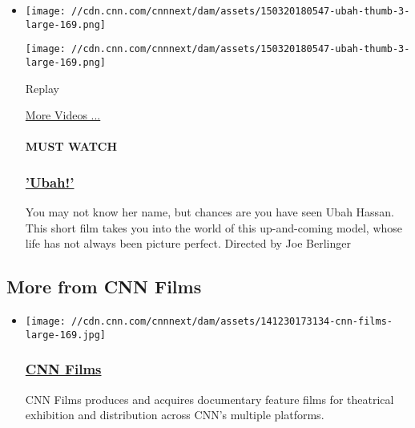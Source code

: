 \begin{itemize}
\item
  \texttt{[image: //cdn.cnn.com/cnnnext/dam/assets/150320180547-ubah-thumb-3-large-169.png]}

  \texttt{[image: //cdn.cnn.com/cnnnext/dam/assets/150320180547-ubah-thumb-3-large-169.png]}\href{javascript:void(0);}{}

  Replay

  \href{/videos}{More Videos ...}

  \hypertarget{must-watch-4}{%
  \paragraph{MUST WATCH}\label{must-watch-4}}

  \hypertarget{ubah}{%
  \subsubsection{\texorpdfstring{\href{/videos/us/2015/03/24/digital-shorts-ubah-fashion-model-orig.cnn}{'Ubah!'}}{'Ubah!'}}\label{ubah}}

  You may not know her name, but chances are you have seen Ubah Hassan.
  This short film takes you into the world of this up-and-coming model,
  whose life has not always been picture perfect. Directed by Joe
  Berlinger
\end{itemize}

\hypertarget{more-from-cnn-films-}{%
\subsection{More from CNN Films~}\label{more-from-cnn-films-}}

\begin{itemize}
\item
  \href{http://www.cnn.com/shows/cnn-films}{}

  \texttt{[image: //cdn.cnn.com/cnnnext/dam/assets/141230173134-cnn-films-large-169.jpg]}

  \hypertarget{cnn-films}{%
  \subsubsection{\texorpdfstring{\href{http://www.cnn.com/shows/cnn-films}{CNN
  Films}}{CNN Films}}\label{cnn-films}}

  CNN Films produces and acquires documentary feature films for
  theatrical exhibition and distribution across CNN's multiple
  platforms.
\end{itemize}

